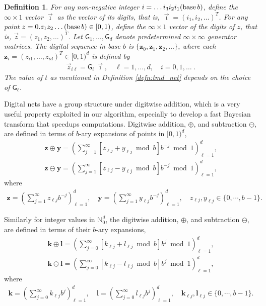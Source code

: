 \documentclass{iitthesis}          %
\newtheorem{defn}{Definition}
\newcommand{\bm}[1]{\boldsymbol{#1}}
\newcommand{\naturals}{\mathbb{N}}
\newcommand{\vk}{\bm{k}}
\newcommand{\vl}{\bm{l}}
\newcommand{\vy}{\bm{y}}
\newcommand{\vz}{\bm{z}}
\begin{document}
\begin{defn}
For any non-negative integer $i = \dots i_3 i_2 i_1(\textup{base} \, b)$, define the $\infty \times 1$ vector $\vec{\imath}$ as the vector of its digits, that is, $\vec{\imath} = (i_1, i_2, \dots)^T$. 
For any point $z = 0.z_1 z_2 \dots (\textup{base}\, b) \in [0, 1)$, define the $\infty \times 1$ vector of the digits of $z$, that is, $\vec{z} = (z_1, z_2, \dots)^T$. 
Let $ \mathsf{G}_1, \dots , \mathsf{G}_d$ denote predetermined $\infty \times \infty$ generator matrices. 
The digital sequence in \textup{base} $b$ is $\{\vz_0, \vz_1, \vz_2, \dots\}$, where each $\vz_i = ( z_{i1}, \dots , z_{id})^T \in [0, 1)^d$ is defined by
\begin{align*}
\vec{z}_{i\ell} = \mathsf{G}_{\ell} \, \vec{\imath}, \quad \ell = 1, \dots, d, \quad i = 0, 1, \dots \;.
\end{align*}
The value of $t$ as mentioned in Definition \ref{defn:tmd_net} depends on the choice of $\mathsf{G}_{\ell}$.
\end{defn}



Digital nets have a group structure under digitwise addition, which is a very useful property exploited in our algorithm, especially to develop a fast Bayesian transform that speedups computations.
Digitwise addition, $\oplus$, and subtraction $\ominus$, are defined in terms of $b$-ary expansions of points in $[0, 1)^d$,
\begin{align*}
\vz \oplus \vy = \left( \sum_{j=1}^\infty [z_{\ell j} + y_{\ell j} \bmod b] b^{-j} \bmod 1 \right)_{\ell=1}^d,
\\
\vz \ominus \vy = \left( \sum_{j=1}^\infty [z_{\ell j} - y_{\ell j} \bmod b] b^{-j} \bmod 1 \right)_{\ell=1}^d,
\end{align*}
where
\begin{align*}
\vz = \left( \sum_{j=1}^{\infty} z_{\ell j}b^{-j}\right)_{\ell=1}^d, \quad
\vy = \left( \sum_{j=1}^{\infty} y_{\ell j}b^{-j}\right)_{\ell=1}^d, \quad
z_{\ell j}, y_{\ell j} \in \{0,\cdots,b-1\}.
\end{align*}



Similarly for integer values in $\naturals_0^d$, the digitwise addition, $\oplus$, and subtraction $\ominus$, are defined in terms of their $b$-ary expansions,
\begin{align*}
\vk \oplus \vl = \left( \sum_{j=0}^\infty [k_{\ell j} + l_{\ell j} \bmod b] b^{j} \bmod 1 \right)_{\ell=1}^d,
\\
\vk \ominus \vl = \left( \sum_{j=0}^\infty [k_{\ell j} - l_{\ell j} \bmod b] b^{j} \bmod 1 \right)_{\ell=1}^d,
\end{align*}
where
\begin{align*}
\vk = \left( \sum_{j=0}^{\infty} k_{\ell j}b^{j}\right)_{\ell=1}^d, \quad
\vl = \left( \sum_{j=0}^{\infty} l_{\ell j}b^{j}\right)_{\ell=1}^d, \quad
\vk_{\ell j}, \vl_{\ell j} \in \{0,\cdots,b-1\}.
\end{align*}
\end{document}
